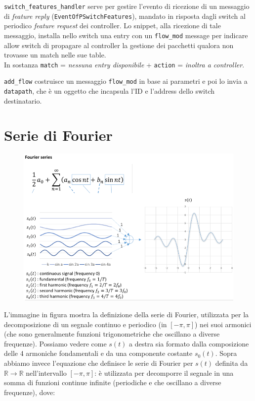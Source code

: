 
\lstinline{switch_features_handler} serve per gestire l'evento di ricezione di un messaggio di \textit{feature reply}  (\lstinline{EventOfPSwitchFeatures}), mandato in risposta dagli switch al periodico \textit{feature request} dei controller.
Lo snippet, alla ricezione di tale messaggio, installa nello switch una entry con un \lstinline{flow_mod} message per indicare allow switch di propagare al controller la gestione dei pacchetti qualora non trovasse un match nelle sue table. \\
In sostanza \lstinline{match} = \textit{nessuna entry disponibile} + \lstinline{action} = \textit{inoltra a controller}.

\lstinline{add_flow} costruisce un messaggio \lstinline{flow_mod} in base ai parametri e poi lo invia a \lstinline{datapath}, che è un oggetto che incapsula l'ID e l'address dello switch destinatario.

\section{Serie di Fourier}

\begin{figure}[htbp]
   \centering
   \includegraphics[width=0.55\columnwidth]{images/questions/Schermata del 2023-11-03 14-44-22.png}
   \label{fig:dom2.15}
\end{figure}

L'immagine in figura mostra la definizione della serie di Fourier, utilizzata per la decomposizione di un segnale continuo e periodico (in $[-\pi,\pi]$) nei suoi armonici (che sono generalmente funzioni trigonometriche che oscillano a diverse frequenze). Possiamo vedere come $s(t)$ a destra sia formato dalla composizione delle 4 armoniche fondamentali e da una componente costante $s_0(t)$. Sopra abbiamo invece l'equazione che definisce le serie di Fourier per $s(t)$ definita da $\mathbb{R} \xrightarrow{} \mathbb{R}$ nell'intervallo $[ -\pi, \pi ]$: è utilizzata per decomporre il segnale in una somma di funzioni continue infinite (periodiche e che oscillano a diverse frequenze), dove:

